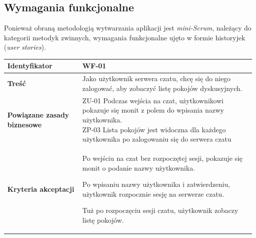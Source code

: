 \subsection{Wymagania funkcjonalne}

Ponieważ obraną metodologią wytwarzania aplikacji jest \textit{mini-Scrum}, należący do kategorii metodyk zwinnych, wymagania funkcjonalne ujęto w formie historyjek (\textit{user stories}).

\vspace{2em}

\begin{tabular}{ | l | l | }
	\hline
		\textbf{Identyfikator} &
		WF-01
		\\

	\hline
		\textbf{Treść} & \parbox[t]{11cm}{
			Jako użytkownik serwera czatu, chcę się do niego zalogować, aby zobaczyć listę pokojów dyskusyjnych.
		}\\

	\hline
		\parbox[t]{4cm}{\textbf{Powiązane zasady biznesowe}} & \parbox[t]{11cm}{
			ZU-01 Podczas wejścia na czat, użytkownikowi pokazuje się monit z polem do wpisania nazwy użytkownika. \\
			ZP-03 Lista pokojów jest widoczna dla każdego użytkownika
			po zalogowaniu się do serwera czatu
		}\\

	\hline
		\parbox[t]{4cm}{\textbf{Kryteria akceptacji}} & \parbox[t]{11cm}{
			\begin{enumreq}
				\item Po wejściu na czat bez rozpoczętej sesji, pokazuje się monit o podanie nazwy użytkownika.
				\item Po wpisaniu nazwy użytkownika i zatwierdzeniu, użytkownik rozpocznie sesję na serwerze czatu.
				\item Tuż po rozpoczęciu sesji czatu, użytkownik zobaczy listę pokojów.
			\end{enumreq}
			}
		\\

	\hline
\end{tabular}

\vspace{2em}

